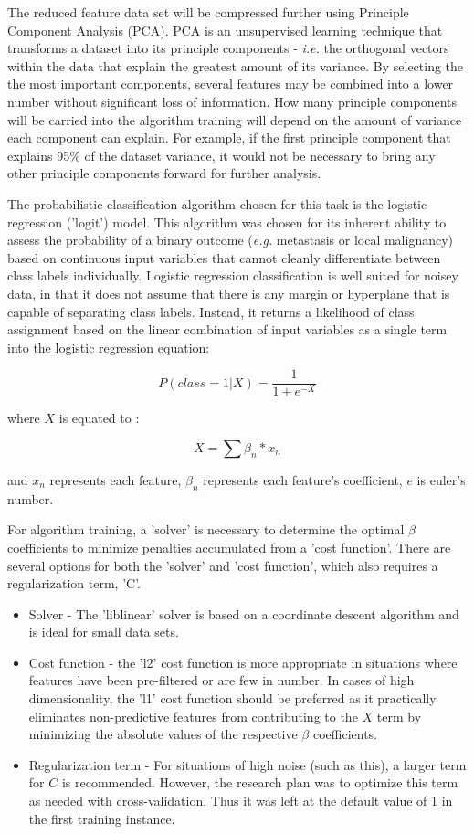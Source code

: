\documentclass[final]{article}
\begin{document}
The reduced feature data set will be compressed further using Principle Component
Analysis (PCA).  PCA is an unsupervised learning technique that transforms a
dataset into its principle components - \textit{i.e.} the orthogonal vectors within the
data that explain the greatest amount of its variance.  By selecting the
the most important components, several features may be combined into a lower
number without significant loss of information.  How many principle components
will be carried into the algorithm training will depend on the amount of variance
each component can explain.  For example, if the first principle component that
explains 95\% of the dataset variance, it would not be necessary to bring any other
principle components forward for further analysis.

The probabilistic-classification algorithm chosen for this task is the logistic
regression ('logit') model.  This algorithm was chosen for its inherent ability
to assess the probability of a binary outcome (\textit{e.g.} metastasis or local
malignancy) based on continuous input variables that cannot cleanly differentiate between
class labels individually.  Logistic regression classification is well suited
for noisey data, in that it does not assume that there is any margin or hyperplane that
is capable of separating class labels.  Instead, it returns a likelihood of class assignment
based on the linear combination of input variables as a single term into the logistic
regression equation:

$$ P(class = 1 | X) = \frac{1}{1+e^{-X}}$$

where $X$ is equated to :

$$ X = \sum{ \beta_{n}*x_{n}} $$

and $x_{n}$ represents each feature, $\beta_{n}$ represents each feature's coefficient, $e$ is
euler's number.

For algorithm training, a 'solver' is necessary to determine the optimal $\beta$
coefficients to minimize penalties accumulated from a 'cost function'.  There are
several options for both the 'solver' and 'cost function', which also requires
a regularization term, 'C'.

\begin{itemize}
  \item Solver - The 'liblinear' solver is based on a coordinate descent algorithm and
  is ideal for small data sets.
  \item Cost function - the 'l2' cost function is more appropriate in situations
  where features have been pre-filtered or are few in number.  In cases of high
  dimensionality, the 'l1' cost function should be preferred as it practically eliminates
  non-predictive features from contributing to the $X$ term by minimizing the absolute
  values of the respective $\beta$ coefficients.
  \item Regularization term - For situations of high noise (such as this), a larger term
  for $C$ is recommended.  However, the research plan was to optimize this term as needed with
  cross-validation.  Thus it was left at the default value of 1 in the first training instance.
\end{itemize}
\end{document}
